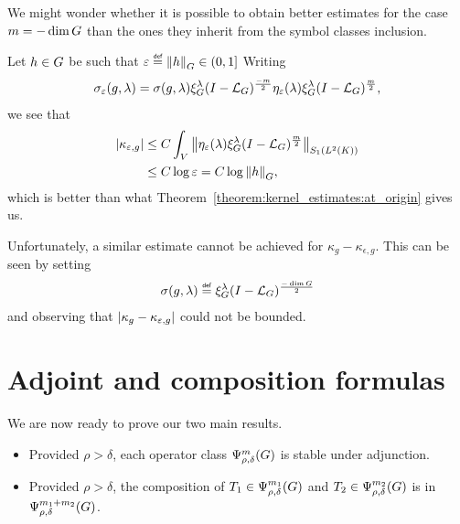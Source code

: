 \begin{remark}[Kernel estimates when $m = -\dim \Group$]
    We might wonder whether it is possible to obtain better estimates for the case $m = -\dim \Group$
    than the ones they inherit from the symbol classes inclusion.

    Let $h \in \Group$ be such that $\epsilon \defeq \norm [\Group] h \in (0, 1]$
    Writing
    \begin{align*}
        \sigma_\epsilon(g, \lambda)
        = \sigma(g, \lambda) \Rep \lambda \BesselPotential {-m} \eta_\epsilon(\lambda) \Rep \lambda \BesselPotential {m},
    \end{align*}
    we see that
    \begin{align*}
        \abs {\kappa_{\epsilon, g}}
        &\leq C \int_\VectorSpace \norm [\SchattenClasses 1 {\Lebesgue 2 \CompactGroup}] {\eta_\epsilon(\lambda) \Rep \lambda \BesselPotential m}\\
        &\leq C \log \epsilon = C \log \norm [\Group] h,
    \end{align*}
    which is better than what Theorem~\ref{theorem:kernel_estimates:at_origin} gives us.

    Unfortunately,
    a similar estimate cannot be achieved for $\kappa_g - \kappa_{\epsilon, g}$.
    This can be seen by setting
    \begin{align*}
        \sigma(g, \lambda) \defeq \Rep \lambda \BesselPotential {-\dim \Group}
    \end{align*}
    and observing that
    $\abs {\kappa_g - \kappa_{\epsilon, g}}$ could not be bounded.
\end{remark}

\section{Adjoint and composition formulas}

We are now ready to prove our two main results.

\begin{itemize}
    \item Provided $\rho > \delta$,
        each operator class $\OperatorClass m {\rho, \delta}$ is stable under adjunction.
    \item Provided $\rho > \delta$,
        the composition of $T_1 \in \OperatorClass {m_1} {\rho, \delta}$ and $T_2 \in \OperatorClass {m_2} {\rho, \delta}$ is in $\OperatorClass {m_1 + m_2} {\rho, \delta}$.
\end{itemize}

